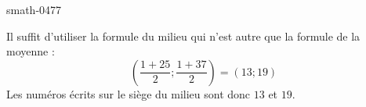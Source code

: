 
\begin{corrige}{smath-0477}

    Il suffit d'utiliser la formule du milieu qui n'est autre que la formule de la moyenne :
    \begin{equation}
        \left( \frac{ 1+25 }{2};\frac{ 1+37 }{2} \right)=(13;19)
    \end{equation}
    Les numéros écrits sur le siège du milieu sont donc \( 13\) et \( 19\).

\end{corrige}
